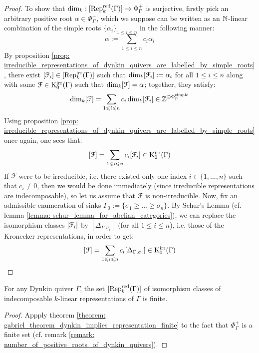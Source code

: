 \begin{proof}
                    To show that $\dim_k: [\mathrm{Rep}_k^{\mathrm{red}}(\Gamma)] \to \Phi_{\Gamma}^+$ is surjective, firstly pick an arbitrary positive root $\alpha \in \Phi_{\Gamma}^+$, which we suppose can be written as an $\mathbb{N}$-linear combination of the simple roots $\{\alpha_i\}_{1 \leq i \leq n}$ in the following manner:
                        $$\alpha := \sum_{1 \leq i \leq n} c_i \alpha_i$$
                    By proposition \ref{prop: irreducible_representations_of_dynkin_quivers_are_labelled_by_simple_roots}, there exist $[\mathcal{F}_i] \in [\mathrm{Rep}_k^{\mathrm{irr}}(\Gamma)]$ such that $\dim_k [\mathcal{F}_i] := \alpha_i$ for all $1 \leq i \leq n$ along with some $\mathcal{F} \in \mathrm{K}_0^{\mathrm{irr}}(\Gamma)$ such that $\dim_k [\mathcal{F}] = \alpha$; together, they satisfy:
                        $$\dim_k [\mathcal{F}] = \sum_{1 \leqslant i \leqslant n} c_i \dim_k [\mathcal{F}_i] \in \mathbb{Z}^{\oplus \Phi_{\Gamma}^{\mathrm{simple}}}$$
                    Using proposition \ref{prop: irreducible_representations_of_dynkin_quivers_are_labelled_by_simple_roots} once again, one sees that:
                        $$[\mathcal{F}] = \sum_{1 \leqslant i \leqslant n} c_i [\mathcal{F}_i] \in \mathrm{K}_0^{\mathrm{irr}}(\Gamma)$$
                    If $\mathcal{F}$ were to be irreducible, i.e. there existed only one index $i \in \{1, ..., n\}$ such that $c_i \not = 0$, then we would be done immediately (since irreducible representations are indecomposable), so let us assume that $\mathcal{F}$ is non-irreducible. Now, fix an admissible enumeration of sinks $\Gamma_0 := \{\sigma_1 \geq ... \geq \sigma_n\}$. By Schur's Lemma (cf. lemma \ref{lemma: schur_lemma_for_abelian_categories}), we can replace the isomorphism classes $[\mathcal{F}_i]$ by $[\Delta_{\Gamma, \sigma_i}]$ (for all $1 \leq i \leq n$), i.e. those of the Kronecker representations, in order to get:
                        $$[\mathcal{F}] = \sum_{1 \leqslant i \leqslant n} c_i [\Delta_{\Gamma, \sigma_i}] \in \mathrm{K}_0^{\mathrm{irr}}(\Gamma)$$
                    
                \end{proof}
            \begin{corollary} \label{coro: dynkin_quivers_are_representation_finite}
                For any Dynkin quiver $\Gamma$, the set $[\mathrm{Rep}_k^{\mathrm{red}}(\Gamma)]$ of isomorphism classes of indecomposable $k$-linear representations of $\Gamma$ is finite. 
            \end{corollary}
                \begin{proof}
                    Appply theorem \ref{theorem: gabriel_theorem_dynkin_implies_representation_finite} to the fact that $\Phi_{\Gamma}^+$ is a finite set (cf. remark \ref{remark: number_of_positive_roots_of_dynkin_quivers}).
                \end{proof}
            
